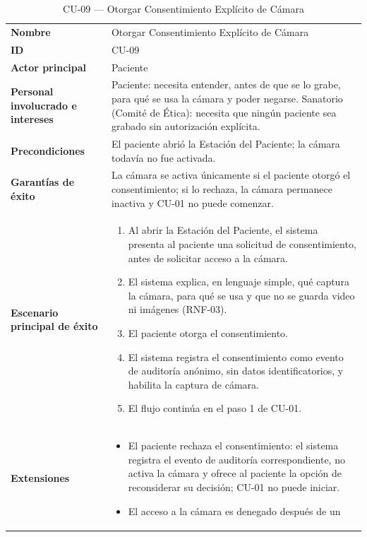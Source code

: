 \begin{longtable}{@{}>{\raggedright\arraybackslash}p{4.1cm} >{\raggedright\arraybackslash}p{\dimexpr\textwidth-4.1cm-2\tabcolsep\relax}@{}}
\caption{CU-09 --- Otorgar Consentimiento Explícito de Cámara}\\
\toprule
\textbf{Nombre} & Otorgar Consentimiento Explícito de Cámara \\
\textbf{ID} & CU-09 \\
\textbf{Actor principal} & Paciente \\
\textbf{Personal involucrado e intereses} &
Paciente: necesita entender, antes de que se lo grabe, para qué se usa la
cámara y poder negarse. \newline
Sanatorio (Comité de Ética): necesita que ningún paciente sea grabado sin
autorización explícita. \\
\textbf{Precondiciones} &
El paciente abrió la Estación del Paciente; la cámara todavía no fue
activada. \\
\textbf{Garantías de éxito} &
La cámara se activa únicamente si el paciente otorgó el consentimiento; si
lo rechaza, la cámara permanece inactiva y CU-01 no puede comenzar. \\
\textbf{Escenario principal de éxito} &
\begin{enumerate}[leftmargin=*, itemsep=2pt]
    \item Al abrir la Estación del Paciente, el sistema presenta al
    paciente una solicitud de consentimiento, antes de solicitar acceso a
    la cámara.
    \item El sistema explica, en lenguaje simple, qué captura la cámara,
    para qué se usa y que no se guarda video ni imágenes (RNF-03).
    \item El paciente otorga el consentimiento.
    \item El sistema registra el consentimiento como evento de auditoría
    anónimo, sin datos identificatorios, y habilita la captura de cámara.
    \item El flujo continúa en el paso 1 de CU-01.
\end{enumerate} \\
\textbf{Extensiones} &
\begin{itemize}[leftmargin=*, itemsep=2pt]
    \item[3a.] El paciente rechaza el consentimiento: el sistema registra
    el evento de auditoría correspondiente, no activa la cámara y ofrece
    al paciente la opción de reconsiderar su decisión; CU-01 no puede
    iniciar.
    \item[3b.] El acceso a la cámara es denegado después de un

\end{itemize}
\end{longtable}
